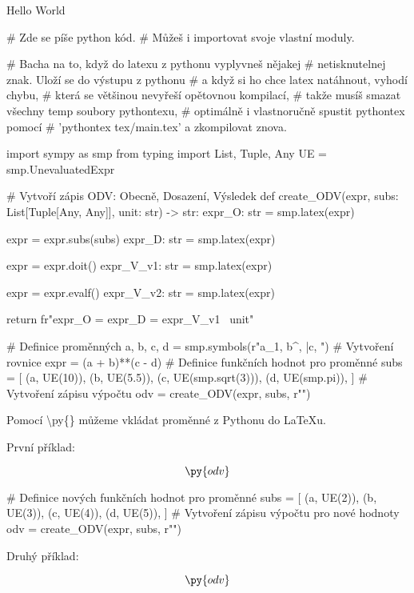 \documentclass[12pt]{article}
\begin{document}
Hello World

\begin{pycode}
# Zde se píše python kód.
# Můžeš i importovat svoje vlastní moduly.

# Bacha na to, když do latexu z pythonu vyplyvneš nějakej
# netisknutelnej znak. Uloží se do výstupu z pythonu
# a když si ho chce latex natáhnout, vyhodí chybu,
# která se většinou nevyřeší opětovnou kompilací, 
# takže musíš smazat všechny temp soubory pythontexu,
# optimálně i vlastnoručně spustit pythontex pomocí
# 'pythontex tex/main.tex' a zkompilovat znova.

import sympy as smp
from typing import List, Tuple, Any
UE = smp.UnevaluatedExpr

# Vytvoří zápis ODV: Obecně, Dosazení, Výsledek
def create_ODV(expr, subs: List[Tuple[Any, Any]], unit: str) -> str:
    expr_O: str = smp.latex(expr)

    expr = expr.subs(subs)
    expr_D: str = smp.latex(expr)

    expr = expr.doit()
    expr_V_v1: str = smp.latex(expr)

    expr = expr.evalf()
    expr_V_v2: str = smp.latex(expr)

    return fr"{expr_O} = {expr_D} = {expr_V_v1}  \, {unit}"
\end{pycode}

\begin{pycode}
# Definice proměnných
a, b, c, d = smp.symbols(r"a_{1}, b^{\prime}, \bar{c}, ")
# Vytvoření rovnice
expr = (a + b)**(c - d)
# Definice funkčních hodnot pro proměnné
subs = [
    (a, UE(10)),
    (b, UE(5.5)),
    (c, UE(smp.sqrt(3))),
    (d, UE(smp.pi)),
]
# Vytvoření zápisu výpočtu
odv = create_ODV(expr, subs, r"")
\end{pycode}

Pomocí \textbackslash py\{\} můžeme vkládat proměnné z Pythonu do LaTeXu.

První příklad:

$$\py{odv}$$

\begin{pycode}
# Definice nových funkčních hodnot pro proměnné
subs = [
    (a, UE(2)),
    (b, UE(3)),
    (c, UE(4)),
    (d, UE(5)),
]
# Vytvoření zápisu výpočtu pro nové hodnoty
odv = create_ODV(expr, subs, r"")
\end{pycode}

Druhý příklad:

$$\py{odv}$$
\end{document}

